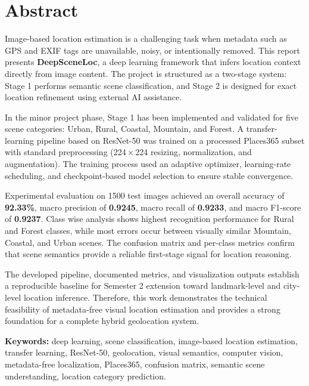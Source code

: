 \chapter*{Abstract}

Image-based location estimation is a challenging task when metadata such as GPS and EXIF tags are unavailable, noisy, or intentionally removed. This report presents \textbf{DeepSceneLoc}, a deep learning framework that infers location context directly from image content. The project is structured as a two-stage system: Stage 1 performs semantic scene classification, and Stage 2 is designed for exact location refinement using external AI assistance.

In the minor project phase, Stage 1 has been implemented and validated for five scene categories: Urban, Rural, Coastal, Mountain, and Forest. A transfer-learning pipeline based on ResNet-50 was trained on a processed Places365 subset with standard preprocessing (224\,$\times$\,224 resizing, normalization, and augmentation). The training process used an adaptive optimizer, learning-rate scheduling, and checkpoint-based model selection to ensure stable convergence.

Experimental evaluation on 1500 test images achieved an overall accuracy of \textbf{92.33\%}, macro precision of \textbf{0.9245}, macro recall of \textbf{0.9233}, and macro F1-score of \textbf{0.9237}. Class wise analysis shows highest recognition performance for Rural and Forest classes, while most errors occur between visually similar Mountain, Coastal, and Urban scenes. The confusion matrix and per-class metrics confirm that scene semantics provide a reliable first-stage signal for location reasoning.

The developed pipeline, documented metrics, and visualization outputs establish a reproducible baseline for Semester 2 extension toward landmark-level and city-level location inference. Therefore, this work demonstrates the technical feasibility of metadata-free visual location estimation and provides a strong foundation for a complete hybrid geolocation system.

\textbf{Keywords:} deep learning, scene classification, image-based location estimation, transfer learning, ResNet-50, geolocation, visual semantics, computer vision, metadata-free localization, Places365, confusion matrix, semantic scene understanding, location category prediction.

